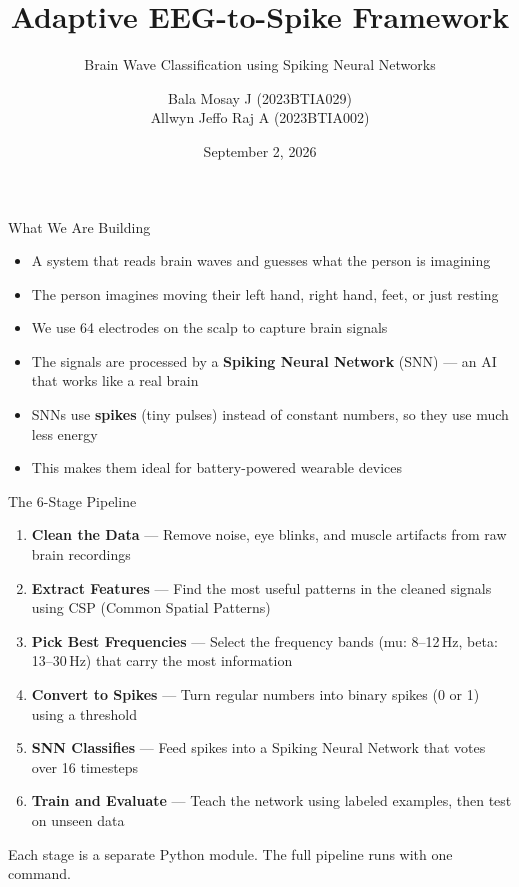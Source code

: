 \documentclass[10pt]{beamer}
\title{Adaptive EEG-to-Spike Framework}
\subtitle{Brain Wave Classification using Spiking Neural Networks}
\author{
  Bala Mosay J \quad (2023BTIA029) \\[2pt]
  Allwyn Jeffo Raj A \quad (2023BTIA002)
}
\institute{Under the guidance of Dr.\ Vaibhav Meshram}
\date{September 2, 2026}
\begin{document}
\begin{frame}
\titlepage
\end{frame}

\begin{frame}{What We Are Building}

\small
\begin{itemize}
  \item A system that reads brain waves and guesses what the person is imagining
  \item The person imagines moving their left hand, right hand, feet, or just resting
  \item We use 64 electrodes on the scalp to capture brain signals
  \item The signals are processed by a \textbf{Spiking Neural Network} (SNN) --- an AI that works like a real brain
  \item SNNs use \textbf{spikes} (tiny pulses) instead of constant numbers, so they use much less energy
  \item This makes them ideal for battery-powered wearable devices
\end{itemize}

\end{frame}

\begin{frame}{The 6-Stage Pipeline}

\small
\begin{enumerate}
  \item \textbf{Clean the Data} --- Remove noise, eye blinks, and muscle artifacts from raw brain recordings
  \item \textbf{Extract Features} --- Find the most useful patterns in the cleaned signals using CSP (Common Spatial Patterns)
  \item \textbf{Pick Best Frequencies} --- Select the frequency bands (mu: 8--12\,Hz, beta: 13--30\,Hz) that carry the most information
  \item \textbf{Convert to Spikes} --- Turn regular numbers into binary spikes (0 or 1) using a threshold
  \item \textbf{SNN Classifies} --- Feed spikes into a Spiking Neural Network that votes over 16 timesteps
  \item \textbf{Train and Evaluate} --- Teach the network using labeled examples, then test on unseen data
\end{enumerate}

\vspace{4pt}
Each stage is a separate Python module. The full pipeline runs with one command.

\end{frame}
\end{document}
